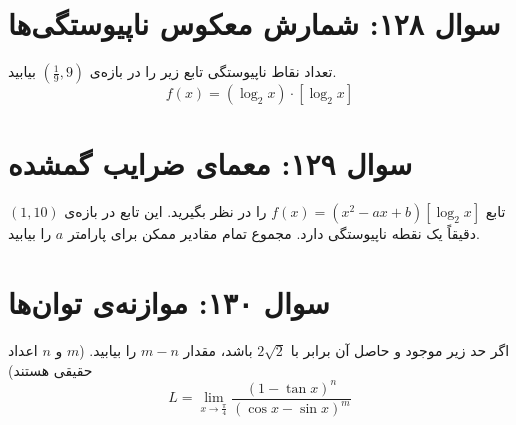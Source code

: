 \documentclass[12pt]{article}
\begin{document}
\vspace{1cm}
\hrulefill
\vspace{1cm}


\section*{سوال ۱۲۸: شمارش معکوس ناپیوستگی‌ها}
تعداد نقاط ناپیوستگی تابع زیر را در بازه‌ی \( (\frac{1}{9}, 9) \) بیابید.
\begin{displaymath}
	f(x) = (\log_2 x) \cdot [\log_2 x]
\end{displaymath}

\vspace{1cm}
\hrulefill
\vspace{1cm}

\section*{سوال ۱۲۹: معمای ضرایب گمشده}
تابع \( f(x) = (x^2 - ax + b)[\log_2 x] \) را در نظر بگیرید. این تابع در بازه‌ی \( (1, 10) \) دقیقاً یک نقطه ناپیوستگی دارد. مجموع تمام مقادیر ممکن برای پارامتر \(a\) را بیابید.

\vspace{1cm}
\hrulefill
\vspace{1cm}

\section*{سوال ۱۳۰: موازنه‌ی توان‌ها}
اگر حد زیر موجود و حاصل آن برابر با \(2\sqrt{2}\) باشد، مقدار \(m-n\) را بیابید. (\(m\) و \(n\) اعداد حقیقی هستند)
\begin{displaymath}
	L = \lim_{x \to \frac{\pi}{4}} \frac{(1-\tan x)^n}{(\cos x - \sin x)^m}
\end{displaymath}

\vspace{1cm}
\hrulefill
\vspace{1cm}
\end{document}
